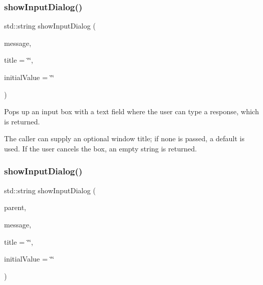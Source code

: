 \subsubsection{\texorpdfstring{show\+Input\+Dialog()}{showInputDialog()}\hspace{0.1cm}{\footnotesize\ttfamily [1/3]}}
{\footnotesize\ttfamily std\+::string show\+Input\+Dialog (\begin{DoxyParamCaption}\item[{const std\+::string \&}]{message,  }\item[{const std\+::string \&}]{title = {\ttfamily \char`\"{}\char`\"{}},  }\item[{const std\+::string \&}]{initial\+Value = {\ttfamily \char`\"{}\char`\"{}} }\end{DoxyParamCaption})\hspace{0.3cm}{\ttfamily [static]}}



Pops up an input box with a text field where the user can type a response, which is returned. 

The caller can supply an optional window title; if none is passed, a default is used. If the user cancels the box, an empty string is returned. \mbox{\label{classsgl_1_1GOptionPane_a035a6d874c9e81773e7c61305dbecabb}} 
\subsubsection{\texorpdfstring{show\+Input\+Dialog()}{showInputDialog()}\hspace{0.1cm}{\footnotesize\ttfamily [2/3]}}
{\footnotesize\ttfamily std\+::string show\+Input\+Dialog (\begin{DoxyParamCaption}\item[{\mbox{\hyperlink{classsgl_1_1GWindow}{G\+Window}} $\ast$}]{parent,  }\item[{const std\+::string \&}]{message,  }\item[{const std\+::string \&}]{title = {\ttfamily \char`\"{}\char`\"{}},  }\item[{const std\+::string \&}]{initial\+Value = {\ttfamily \char`\"{}\char`\"{}} }\end{DoxyParamCaption})\hspace{0.3cm}{\ttfamily [static]}}



